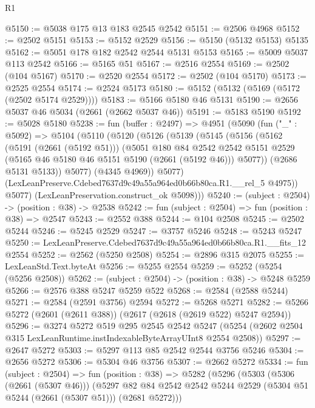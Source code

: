 \begin{lexlean}{R1}
\begin{coremodule}
@5150 := @5038 @175 @13 @183 @2545 @2542
@5151 := @2506 @4968
@5152 := @2502 @5151
@5153 := @5152 @2529
@5156 := @5150 (@5132 @5153) @5135
@5162 := @5051 @178 @182 @2542 @2544 @5131 @5153
@5165 := @5009 @5037 @113 @2542
@5166 := @5165 @51
@5167 := @2516 @2554
@5169 := @2502 (@104 @5167)
@5170 := @2520 @2554
@5172 := @2502 (@104 @5170)
@5173 := @2525 @2554
@5174 := @2524 @5173
@5180 := @5152 (@5132 (@5169 (@5172 (@2502 @5174 @2529))))
@5183 := @5166 @5180 @46 @5131
@5190 := @2656 @5037 @46 @5034 (@2661 (@2662 @5037 @46))
@5191 := @5183 @5190
@5192 := @5028 @5180
@5238 := fun (buffer : @2497) =>
  @4951
    (@5090
      (fun ("_" : @5092) =>
      @5104
        (@5110
          (@5120
            (@5126
              (@5139
                (@5145
                  (@5156
                    (@5162
                      (@5191 (@2661 (@5192 @51)))
                      (@5051
                        @180
                        @84
                        @2542
                        @2542
                        @5151
                        @2529
                        (@5165 @46 @5180 @46 @5151 @5190 (@2661 (@5192 @46)))
                        @5077))
                    (@2686 @5131 @5133))
                  @5077)
                (@4345 @4969))
              @5077)
            (LexLeanPreserve.Cdebed7637d9c49a55a964ed0b66b80ca.R1.__rel_5 @4975))
          @5077)
        (LexLeanPreservation.construct_ok @5098)))
@5240 := (subject : @2504) -> (position : @38) -> @2538
@5242 := fun (subject : @2504) => fun (position : @38) => @2547
@5243 := @2552 @388
@5244 := @104 @2508
@5245 := @2502 @5244
@5246 := @5245 @2529
@5247 := @3757 @5246
@5248 := @5243 @5247
@5250 := LexLeanPreserve.Cdebed7637d9c49a55a964ed0b66b80ca.R1.__fits_12 @2554
@5252 := @2562 (@5250 @2508)
@5254 := @2896 @315 @2075
@5255 := LexLeanStd.Text.byteAt
@5256 := @5255 @2554
@5259 := @5252 (@5254 (@5256 @2508))
@5262 := (subject : @2504) -> (position : @38) -> @5248 @5259
@5266 := @2576 @388 @5247 @5259 @522
@5268 := @2584 (@2588 @5244)
@5271 := @2584 (@2591 @3756) @2594
@5272 := @5268 @5271
@5282 := @5266 @5272 (@2601 (@2611 @388)) (@2617 (@2618 (@2619 @522) @5247 @2594))
@5296 := @3274
    @5272
    @519
    @295
    @2545
    @2542
    @5247
    (@5254 (@2602 @2504 @315 LexLeanRuntime.instIndexableByteArrayUInt8 @2554 @2508))
@5297 := @2647 @5272
@5303 := @5297 @113 @85 @2542 @2544 @3756 @5246
@5304 := @2656 @5272
@5306 := @5304 @46 @3756
@5307 := @2662 @5272
@5334 := fun (subject : @2504) =>
  fun (position : @38) =>
  @5282
    (@5296
      (@5303
        (@5306 (@2661 (@5307 @46)))
        (@5297 @82 @84 @2542 @2542 @5244 @2529 (@5304 @51 @5244 (@2661 (@5307 @51))) (@2681 @5272)))

\end{coremodule}
\end{lexlean}
